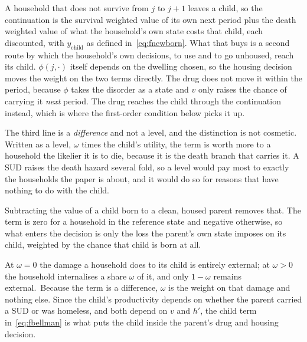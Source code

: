 \documentclass[10pt]{article}
\begin{document}
A
household that does not survive from $j$ to $j+1$ leaves a child, so the
continuation is the survival weighted value of its own next period plus the death
weighted value of what the household's own state costs that child,
each discounted, with $y_{\text{child}}$
as defined in~\eqref{eq:fnewborn}. What that buys is a second route by
which the household's own decisions, to use and to go unhoused, reach its child.
$\phi(j,\cdot)$ itself depends on the dwelling chosen, so the housing
decision moves the weight on the two terms directly. The drug does not move it
within the period, because $\phi$ takes the disorder as a state and $v$ only raises
the chance of carrying it \emph{next} period. The drug reaches the child through the
continuation instead, which is where the first-order condition below picks it up.

The third line is a \emph{difference} and not a level, and the
distinction is not cosmetic. Written as a level, $\omega$ times the child's
utility, the term is worth more to a household the likelier it is to die,
because it is the death branch that carries it. A SUD raises the death hazard
several fold, so a level would pay most to exactly the households the paper is
about, and it would do so for reasons that have nothing to do with the child.

Subtracting the value of a child born to a clean, housed parent removes that. The
term is zero for a household in the reference state and negative otherwise, so
what enters the decision is only the loss the parent's own state imposes on its
child, weighted by the chance that child is born at all.

At $\omega=0$ the damage a household does to its child is entirely
external; at
$\omega>0$ the household internalises a share $\omega$ of it, and only $1-\omega$
remains external.\ Because the term is a difference, $\omega$ is the
weight on that damage and nothing else. Since the child's productivity depends on whether the parent
carried a SUD or was homeless, and both depend on $v$ and $h'$, the child
term in~\eqref{eq:fbellman} is
what puts the child inside the parent's drug and housing decision.
\end{document}
